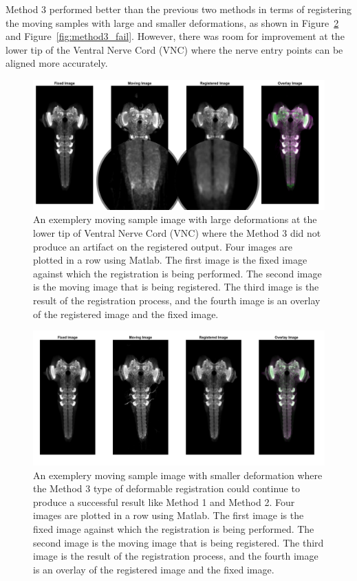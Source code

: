 \documentclass{report}
\begin{document}
	Method 3 performed better than the previous two methods in terms of registering the moving samples with large and smaller deformations, as shown in Figure~\ref{fig:method3_pas} and Figure~\ref{fig:method3_fail}. However, there was room for improvement at the lower tip of the Ventral Nerve Cord (VNC) where the nerve entry points can be aligned more accurately.
	
	\begin{figure}[h!]
		\centering
		\includegraphics[width=0.9\columnwidth]{resources/chapter4/method3/compare/np_52B07_52H01_MB262B_021713B_scaled.png}
		\caption{An exemplery moving sample image with large deformations at the lower tip of Ventral Nerve Cord (VNC) where the Method 3 did not produce an artifact on the registered output. Four images are plotted in a row using Matlab. The first image is the fixed image against which the registration is being performed. The second image is the moving image that is being registered. The third image is the result of the registration process, and the fourth image is an overlay of the registered image and the fixed image.}
		\label{fig:method3_artifact}
	\end{figure}
	
	\begin{figure}[h!]
		\centering
		\includegraphics[width=0.9\columnwidth]{resources/chapter4/method3/compare/np_brain7_scaled.tif.png}
		\caption{An exemplery moving sample image with smaller deformation where the Method 3 type of deformable registration could continue to produce a successful result like Method 1 and Method 2. Four images are plotted in a row using Matlab. The first image is the fixed image against which the registration is being performed. The second image is the moving image that is being registered. The third image is the result of the registration process, and the fourth image is an overlay of the registered image and the fixed image.}
		\label{fig:method3_pas}
	\end{figure}
\end{document}
